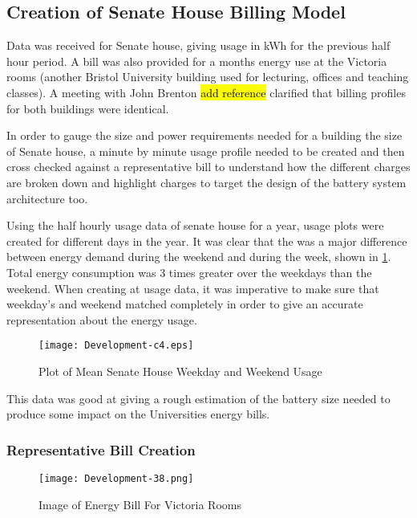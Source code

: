 \subsection{Creation of Senate House Billing
Model}\label{creation-of-senate-house-billing-model}

Data was received for Senate house, giving usage in kWh for the previous
half hour period. A bill was also provided for a months energy use at
the Victoria rooms (another Bristol University building used for
lecturing, offices and teaching classes). A meeting with John Brenton
\hl{add reference} clarified that billing profiles for both buildings
were identical.

In order to gauge the size and power requirements needed for a building
the size of Senate house, a minute by minute usage profile needed to be
created and then cross checked against a representative bill to
understand how the different charges are broken down and highlight
charges to target the design of the battery system architecture too.

Using the half hourly usage data of senate house for a year, usage plots
were created for different days in the year. It was clear that the was a
major difference between energy demand during the weekend and during the
week, shown in \ref{Development-c4}. Total energy consumption was 3
times greater over the weekdays than the weekend. When creating at usage
data, it was imperative to make sure that weekday's and weekend matched
completely in order to give an accurate representation about the energy
usage.\\

\begin{figure}[H]
 \centering
 \texttt{[image: Development-c4.eps]}
 \caption{Plot of Mean Senate House Weekday and Weekend Usage}
 \label{Development-c4}
 \end{figure}

This data was good at giving a rough estimation of the battery size
needed to produce some impact on the Universities energy bills.

\subsubsection{Representative Bill
Creation}\label{representative-bill-creation}

\begin{figure}[H]
 \centering
 \texttt{[image: Development-38.png]}
 \caption{Image of Energy Bill For Victoria Rooms}
 \label{Development-38}
 \end{figure}

